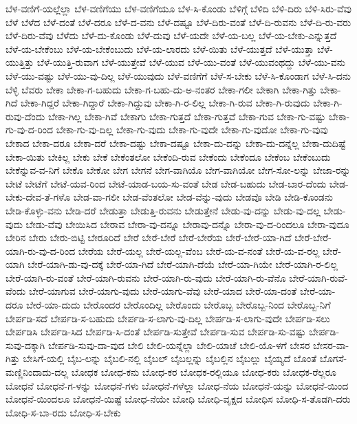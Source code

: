{ಬೆಳ-ವಣಿಗೆ-ಯಲ್ಲೆಲ್ಲಾ
ಬೆಳ-ವಣಿಗೆಯು
ಬೆಳ-ವಣಿಗೆಯೂ
ಬೆಳ-ಸಿ-ಕೊಂಡು
ಬೆಳಿಗ್ಗೆ
ಬೆಳಿದಿ
ಬೆಳಿ-ದಿರು
ಬೆಳಿ-ಸಿರು-ವೆವು
ಬೆಳೆ
ಬೆಳೆದ
ಬೆಳೆ-ದಂತೆ
ಬೆಳೆ-ದರೂ
ಬೆಳೆ-ದ-ವನು
ಬೆಳೆ-ದಷ್ಟೂ
ಬೆಳೆ-ದಿರು-ವಂತೆ
ಬೆಳೆ-ದಿ-ರುವನು
ಬೆಳೆ-ದಿ-ರು-ವರು
ಬೆಳೆ-ದಿರು-ವೆವು
ಬೆಳೆದು
ಬೆಳೆ-ದು-ಕೊಂಡು
ಬೆಳೆ-ದುವು
ಬೆಳೆ-ಯದೇ
ಬೆಳೆ-ಯ-ಬಲ್ಲ
ಬೆಳೆ-ಯ-ಬೇಕು-ಎನ್ನುತ್ತದೆ
ಬೆಳೆ-ಯ-ಬೇಕೆಂಬು
ಬೆಳೆ-ಯ-ಬೇಕೆಂಬುದು
ಬೆಳೆ-ಯ-ಲಾರದು
ಬೆಳೆ-ಯಿತು
ಬೆಳೆ-ಯುತ್ತದೆ
ಬೆಳೆ-ಯುತ್ತಾ
ಬೆಳೆ-ಯುತ್ತಿತ್ತು
ಬೆಳೆ-ಯುತ್ತಿ-ರುವಾಗ
ಬೆಳೆ-ಯುತ್ತೇವೆ
ಬೆಳೆ-ಯುವ
ಬೆಳೆ-ಯು-ವಂತೆ
ಬೆಳೆ-ಯುವಂಥದ್ದು
ಬೆಳೆ-ಯು-ವನು
ಬೆಳೆ-ಯು-ವಷ್ಟು
ಬೆಳೆ-ಯು-ವು-ದಿಲ್ಲ
ಬೆಳೆ-ಯುವುದು
ಬೆಳೆ-ವಣಿಗೆಗೆ
ಬೆಳೆ-ಸ-ಬೇಕು
ಬೆಳೆ-ಸಿ-ಕೊಂಡಾಗ
ಬೆಳೆ-ಸಿ-ದನು
ಬೆಳ್ಳಿ
ಬೆವರು
ಬೇಕಾ
ಬೇಕಾ-ಗ-ಬಹುದು
ಬೇಕಾ-ಗ-ಬಹು-ದು-ಅ-ನಂತರ
ಬೇಕಾ-ಗಲೀ
ಬೇಕಾಗಿ
ಬೇಕಾ-ಗಿತ್ತು
ಬೇಕಾ-ಗಿದೆ
ಬೇಕಾ-ಗಿದ್ದರೆ
ಬೇಕಾ-ಗಿದ್ದಾರೆ
ಬೇಕಾ-ಗಿದ್ದುವು
ಬೇಕಾ-ಗಿ-ರ-ಲಿಲ್ಲ
ಬೇಕಾ-ಗಿ-ರುವ
ಬೇಕಾ-ಗಿ-ರುವುದು
ಬೇಕಾ-ಗಿ-ರುವು-ದೆಂದು
ಬೇಕಾ-ಗಿಲ್ಲ
ಬೇಕಾ-ಗಿವೆ
ಬೇಕಾಗು
ಬೇಕಾ-ಗುತ್ತದೆ
ಬೇಕಾ-ಗುತ್ತವೆ
ಬೇಕಾ-ಗುವ
ಬೇಕಾ-ಗು-ವಷ್ಟು
ಬೇಕಾ-ಗು-ವು-ದ-ರಿಂದ
ಬೇಕಾ-ಗು-ವು-ದಿಲ್ಲ
ಬೇಕಾ-ಗು-ವುದು
ಬೇಕಾ-ಗು-ವುದೇ
ಬೇಕಾ-ಗು-ವುದೋ
ಬೇಕಾ-ಗು-ವುವು
ಬೇಕಾದ
ಬೇಕಾ-ದರೂ
ಬೇಕಾ-ದರೆ
ಬೇಕಾ-ದಷ್ಟು
ಬೇಕಾ-ದಷ್ಟೂ
ಬೇಕಾ-ದು-ದನ್ನು
ಬೇಕಾ-ದು-ದನ್ನೆಲ್ಲ
ಬೇಕಾ-ದುದಿಷ್ಟೆ
ಬೇಕಾ-ಯಿತು
ಬೇಕಿಲ್ಲ
ಬೇಕು
ಬೇಕೆ
ಬೇಕೆಂತಲೋ
ಬೇಕೆಂದಿ-ರುವ
ಬೇಕೆಂದು
ಬೇಕೆಂದೂ
ಬೇಕೆಂಬ
ಬೇಕೆಂಬುದು
ಬೇಕೆನ್ನುವ-ವ-ನಿಗೆ
ಬೇಕೊ
ಬೇಕೋ
ಬೇಗ
ಬೇಗನೆ
ಬೇಗ-ವಾಗಿಯೊ
ಬೇಗ-ವಾಗಿಯೋ
ಬೇಗ-ಸೋ-ಲನ್ನು
ಬೇಜಾ-ರನ್ನು
ಬೇಟೆ
ಬೇಟೆಗೆ
ಬೇಟೆ-ಯವ-ರಿಂದ
ಬೇಟೆ-ಯಾಡ-ಬಯ-ಸು-ವಂತೆ
ಬೇಡ
ಬೇಡ-ಬಹುದು
ಬೇಡ-ಬಾರ-ದೆಂದು
ಬೇಡ-ಬೇಕು-ದೇವ-ತೆ-ಗಳೊ
ಬೇಡ-ವಾ-ಗಲೀ
ಬೇಡ-ವೆಂತಲೋ
ಬೇಡ-ವೆನ್ನು-ವುದು
ಬೇಡವೊ
ಬೇಡಿ
ಬೇಡಿ-ಕೊಂಡನು
ಬೇಡಿ-ಕೊಳ್ಳು-ವನು
ಬೇಡಿ-ದರೆ
ಬೇಡುತ್ತಾ
ಬೇಡುತ್ತಿ-ರುವನು
ಬೇಡುತ್ತೇನೆ
ಬೇಡು-ವು-ದನ್ನು
ಬೇಡು-ವು-ದಲ್ಲ
ಬೇಡು-ವುದು
ಬೇಡು-ವೆವು
ಬೇಯಿಸಿದ
ಬೇರಾವ
ಬೇರಾ-ವು-ದನ್ನೂ
ಬೇರಾವು-ದನ್ನೊ
ಬೇರಾ-ವು-ದ-ರಿಂದಲೂ
ಬೇರಾ-ವುದೂ
ಬೇರಿನ
ಬೇರು
ಬೇರು-ಬಿಟ್ಟಿ
ಬೇರೂರಿದೆ
ಬೇರೆ
ಬೇರೆ-ಬೇರೆ
ಬೇರೆ-ಬೇರೆಯ
ಬೇರೆ-ಬೇರೆ-ಯಾ-ಗಿದೆ
ಬೇರೆ-ಬೇರೆ-ಯಾಗಿ-ರು-ವು-ದ-ರಿಂದ
ಬೇರೆಯ
ಬೇರೆ-ಯಲ್ಲ
ಬೇರೆ-ಯಲ್ಲ-ವೆಂಬ
ಬೇರೆ-ಯ-ವ-ನಂತೆ
ಬೇರೆ-ಯ-ವ-ರಲ್ಲ
ಬೇರೆ-ಯಾಗಿ
ಬೇರೆ-ಯಾಗಿ-ಡು-ವು-ದಕ್ಕೆ
ಬೇರೆ-ಯಾ-ಗಿದೆ
ಬೇರೆ-ಯಾಗಿ-ದೆಯೆ
ಬೇರೆ-ಯಾ-ಗಿಯೇ
ಬೇರೆ-ಯಾಗಿ-ರ-ಲಿಲ್ಲ
ಬೇರೆ-ಯಾಗಿ-ರು-ವಂತೆ
ಬೇರೆ-ಯಾಗಿ-ರುವನು
ಬೇರೆ-ಯಾಗಿ-ರು-ವುದು
ಬೇರೆ-ಯಾಗಿ-ರು-ವೆನೊ
ಬೇರೆ-ಯಾಗಿ-ರುವೆ-ವೆಂದು
ಬೇರೆ-ಯಾಗುವ
ಬೇರೆ-ಯಾಗು-ವುದು
ಬೇರೆ-ಯಾಗು-ವೆವು
ಬೇರೆ-ಯಾದ
ಬೇರೆ-ಯಾ-ದಂತೆ
ಬೇರೆ-ಯಾ-ದರೂ
ಬೇರೆ-ಯಾ-ದುದು
ಬೇರೊಂದರ
ಬೇರೊಂದಿಲ್ಲ
ಬೇರೊಂದು
ಬೇರೊಬ್ಬ
ಬೇರೊಬ್ಬ-ನಿಂದ
ಬೇರೊಬ್ಬ-ನಿಗೆ
ಬೇರ್ಪಡಿ-ಸದೆ
ಬೇರ್ಪಡಿ-ಸ-ಬಹುದು
ಬೇರ್ಪಡಿ-ಸ-ಲಾಗು-ವು-ದಿಲ್ಲ
ಬೇರ್ಪಡಿ-ಸ-ಲಾಗು-ವುದೇ
ಬೇರ್ಪಡಿ-ಸಲು
ಬೇರ್ಪಡಿಸಿ
ಬೇರ್ಪಡಿ-ಸಿದ
ಬೇರ್ಪಡಿ-ಸಿ-ದಂತೆ
ಬೇರ್ಪಡಿ-ಸುತ್ತೇವೆ
ಬೇರ್ಪಡಿ-ಸುವ
ಬೇರ್ಪಡಿ-ಸು-ವಷ್ಟು
ಬೇರ್ಪಡಿ-ಸುವು-ದಕ್ಕಾಗಿ
ಬೇರ್ಪಡಿ-ಸುವು-ದಾ-ವುದ
ಬೇಲಿ
ಬೇಲಿ-ಯನ್ನೆಲ್ಲಾ
ಬೇಲಿ-ಯಾಚೆ
ಬೇಲಿ-ಯೊ-ಳಗೆ
ಬೇಸರ
ಬೇಸರ-ವಾ-ಗಿತ್ತು
ಬೇಸಿಗೆ-ಯಲ್ಲಿ
ಬೈಬ-ಲನ್ನು
ಬೈಬಲಿ-ನಲ್ಲಿ
ಬೈಬಲ್
ಬೈಬಲ್ಲನ್ನು
ಬೈಬಲ್ಲಿನ
ಬೈಬಲ್ಲು
ಬೈಯ್ಯದೆ
ಬೊಂತೆ
ಬೊಗಸೆ-ಮಣ್ಣಿನಿಂದಾದು-ದಲ್ಲ
ಬೋಧಕ
ಬೋಧ-ಕನು
ಬೋಧ-ಕರ
ಬೋಧಕ-ರಲ್ಲಿಯೂ
ಬೋಧ-ಕರು
ಬೋಧಕ-ರೆಲ್ಲರೂ
ಬೋಧನೆ
ಬೋಧನೆ-ಗ-ಳನ್ನು
ಬೋಧನೆ-ಗಳು
ಬೋಧನೆ-ಗಳೆಲ್ಲಾ
ಬೋಧ-ನೆಯ
ಬೋಧನೆ-ಯನ್ನು
ಬೋಧನೆ-ಯಿಂದ
ಬೋಧನೆ-ಯಿಂದಲೂ
ಬೋಧನೆ-ಯಿಷ್ಟೆ
ಬೋಧ-ನೆಯೇ
ಬೋಧಿ
ಬೋಧಿ-ವೃಕ್ಷದ
ಬೋಧಿಸ
ಬೋಧಿ-ಸ-ತೊಡಗಿ-ದರು
ಬೋಧಿ-ಸ-ಬಾ-ರದು
ಬೋಧಿ-ಸ-ಬೇಕು
}
